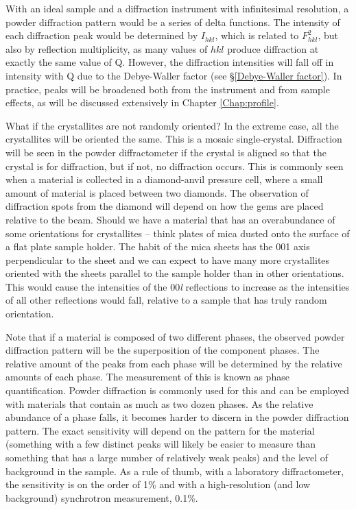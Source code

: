 With an ideal sample and a diffraction instrument with infinitesimal resolution, a powder diffraction pattern would be a series of delta functions. The intensity of each diffraction peak would be determined by $I_{hkl}$, which is related to  $F^2_{hkl}$, but also by reflection multiplicity, as many values of $hkl$ produce diffraction at exactly the same value of Q. 
However, the diffraction intensities will fall off in intensity with Q  due to the Debye-Waller factor (see \S\ref{Debye-Waller factor}). In practice, peaks will be broadened both from the instrument and from sample effects, as will be discussed extensively in Chapter \ref{Chap:profile}.

What if the crystallites are not randomly oriented? In the extreme case, all the crystallites will be oriented the same. This is a mosaic single-crystal. Diffraction will be seen in the powder diffractometer if the crystal is aligned so that the crystal is for diffraction, but if not, no diffraction occurs. This is commonly seen when a material is collected in a diamond-anvil pressure cell, where a small amount of material is placed between two diamonds. The observation of diffraction spots from the diamond will depend on how the gems are placed relative to the beam. Should we have a material that has an overabundance of some orientations for crystallites -- think plates of mica dusted onto the surface of a flat plate sample holder. The habit of the mica sheets has the 001 axis perpendicular to the sheet and we can expect to have many more crystallites oriented with the sheets parallel to the sample holder than in other orientations. This would cause the intensities of the 00\textit{l} reflections to increase as the intensities of all other reflections would fall, relative to a sample that has truly random orientation.  

Note that if a material is composed of two different phases, the observed powder diffraction pattern will be the superposition of the component phases. The relative amount of the peaks from each phase will be determined by the relative amounts of each phase. The measurement of this is known as phase quantification. Powder diffraction is commonly used for this and can be employed with materials that contain as much as two dozen phases. As the relative abundance of a phase falls, it becomes harder to discern in the powder diffraction pattern. The exact sensitivity will depend on the pattern for the material (something with a few distinct peaks will likely be easier to measure than something that has a large number of relatively weak peaks) and the level of background in the sample. As a rule of thumb, with a laboratory diffractometer, the sensitivity is on the order of 1\% and with a high-resolution (and low background) synchrotron measurement, 0.1\%. 

